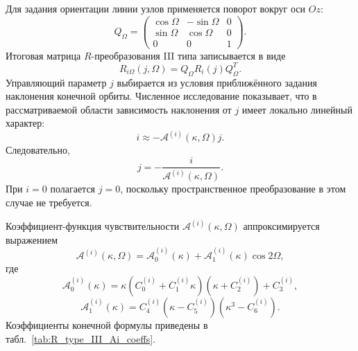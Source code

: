 Для задания ориентации линии узлов применяется поворот вокруг оси \(Oz\):
\begin{equation}
Q_\Omega=
\begin{pmatrix}
	\cos\Omega & -\sin\Omega & 0\\
	\sin\Omega & \cos\Omega & 0\\
	0&0&1
\end{pmatrix}.
\end{equation}
Итоговая матрица \(R\)-преобразования III типа записывается в виде
\begin{equation}
R_{i\Omega}(j,\Omega)=Q_\Omega R_i(j)Q_\Omega^T.
\end{equation}
Управляющий параметр \(j\) выбирается из условия приближённого задания наклонения конечной орбиты. Численное исследование показывает, что в рассматриваемой области зависимость наклонения от \(j\) имеет локально линейный характер:
\begin{equation}
i\approx -\mathcal A^{(i)}(\kappa,\Omega)j.
\end{equation}
Следовательно,
\begin{equation}
j=-\frac{i}{\mathcal A^{(i)}(\kappa,\Omega)}.
\end{equation}
При \(i=0\) полагается \(j=0\), поскольку пространственное преобразование в этом случае не требуется.

Коэффициент-функция чувствительности \(\mathcal A^{(i)}(\kappa,\Omega)\) аппроксимируется выражением
\begin{equation}
\mathcal A^{(i)}(\kappa,\Omega)
=
\mathcal A_0^{(i)}(\kappa)+\mathcal A_1^{(i)}(\kappa)\cos 2\Omega,
\end{equation}
где
\begin{equation}
\mathcal A_0^{(i)}(\kappa)
=
\kappa\left(C_0^{(i)}+C_1^{(i)}\kappa\right)\left(\kappa+C_2^{(i)}\right)+C_3^{(i)},
\end{equation}
\begin{equation}
\mathcal A_1^{(i)}(\kappa)
=
C_4^{(i)}\left(\kappa-C_5^{(i)}\right)\left(\kappa^3-C_6^{(i)}\right).
\end{equation}
Коэффициенты конечной формулы приведены в табл.~\ref{tab:R_type_III_Ai_coeffs}.

